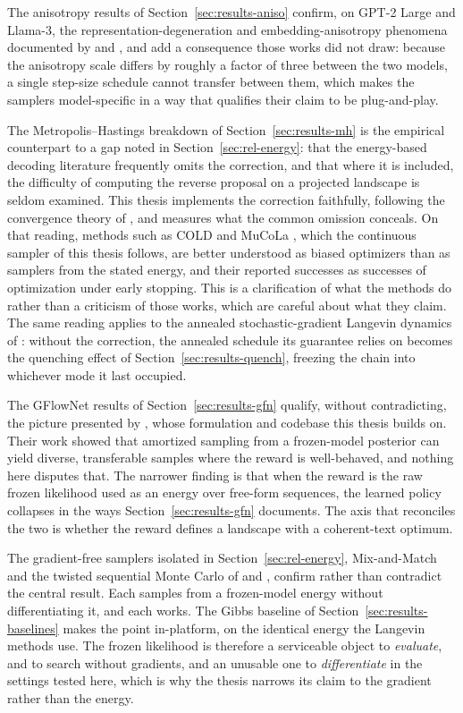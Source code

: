 The anisotropy results of Section~\ref{sec:results-aniso} confirm, on GPT-2 Large and Llama-3, the representation-degeneration and embedding-anisotropy phenomena documented by \citet{gao2019representation} and \citet{ethayarajh2019contextual}, and add a consequence those works did not draw: because the anisotropy scale differs by roughly a factor of three between the two models, a single step-size schedule cannot transfer between them, which makes the samplers model-specific in a way that qualifies their claim to be plug-and-play.

The Metropolis--Hastings breakdown of Section~\ref{sec:results-mh} is the empirical counterpart to a gap noted in Section~\ref{sec:rel-energy}: that the energy-based decoding literature frequently omits the correction, and that where it is included, the difficulty of computing the reverse proposal on a projected landscape is seldom examined. This thesis implements the correction faithfully, following the convergence theory of \citet{roberts1996exponential}, and measures what the common omission conceals. On that reading, methods such as COLD \citep{qin2022cold} and MuCoLa \citep{kumar2022gradient}, which the continuous sampler of this thesis follows, are better understood as biased optimizers than as samplers from the stated energy, and their reported successes as successes of optimization under early stopping. This is a clarification of what the methods do rather than a criticism of those works, which are careful about what they claim. The same reading applies to the annealed stochastic-gradient Langevin dynamics of \citet{welling2011bayesian}: without the correction, the annealed schedule its guarantee relies on becomes the quenching effect of Section~\ref{sec:results-quench}, freezing the chain into whichever mode it last occupied.

The GFlowNet results of Section~\ref{sec:results-gfn} qualify, without contradicting, the picture presented by \citet{hu2024amortizing}, whose formulation and codebase this thesis builds on. Their work showed that amortized sampling from a frozen-model posterior can yield diverse, transferable samples where the reward is well-behaved, and nothing here disputes that. The narrower finding is that when the reward is the raw frozen likelihood used as an energy over free-form sequences, the learned policy collapses in the ways Section~\ref{sec:results-gfn} documents. The axis that reconciles the two is whether the reward defines a landscape with a coherent-text optimum.

The gradient-free samplers isolated in Section~\ref{sec:rel-energy}, Mix-and-Match \citep{mireshghallah2022mixmatch} and the twisted sequential Monte Carlo of \citet{lew2023sequential} and \citet{zhao2024probabilistic}, confirm rather than contradict the central result. Each samples from a frozen-model energy without differentiating it, and each works. The Gibbs baseline of Section~\ref{sec:results-baselines} makes the point in-platform, on the identical energy the Langevin methods use. The frozen likelihood is therefore a serviceable object to \emph{evaluate}, and to search without gradients, and an unusable one to \emph{differentiate} in the settings tested here, which is why the thesis narrows its claim to the gradient rather than the energy.

